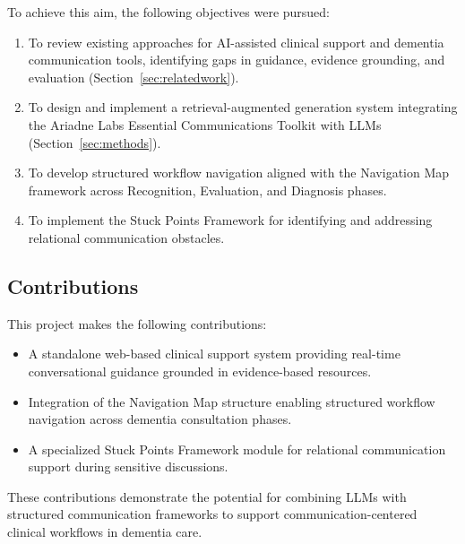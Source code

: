 To achieve this aim, the following objectives were pursued:

\begin{enumerate}
    \item To review existing approaches for AI-assisted clinical support and dementia communication tools, identifying gaps in guidance, evidence grounding, and evaluation (Section~\ref{sec:relatedwork}).
    
    \item To design and implement a retrieval-augmented generation system integrating the Ariadne Labs Essential Communications Toolkit with LLMs (Section~\ref{sec:methods}).
    
    \item To develop structured workflow navigation aligned with the Navigation Map framework across Recognition, Evaluation, and Diagnosis phases.
    
    \item To implement the Stuck Points Framework for identifying and addressing relational communication obstacles.
\end{enumerate}

\subsection{Contributions}

This project makes the following contributions:

\begin{itemize}
    \item A standalone web-based clinical support system providing real-time conversational guidance grounded in evidence-based resources.
    
    \item Integration of the Navigation Map structure enabling structured workflow navigation across dementia consultation phases.
    
    \item A specialized Stuck Points Framework module for relational communication support during sensitive discussions.
\end{itemize}

These contributions demonstrate the potential for combining LLMs with structured communication frameworks to support communication-centered clinical workflows in dementia care.
